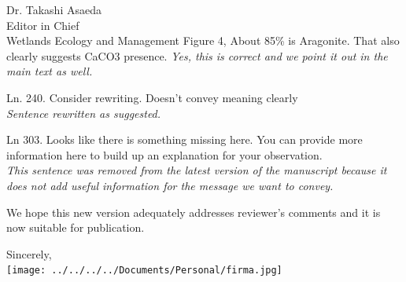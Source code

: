 \documentclass[11pt]{bgcletter}
\begin{document}
\begin{letter}{Dr. Takashi Asaeda\\
 Editor in Chief \\ Wetlands Ecology and Management}
{\color{blue} Figure 4, About 85\% is Aragonite. That also clearly suggests CaCO3 presence. }
{\it Yes, this is correct and we point it out in the main text as well. }

{\color{blue} Ln. 240. Consider rewriting. Doesn't convey meaning clearly} \\
{\it Sentence rewritten as suggested.}

{\color{blue} Ln 303. Looks like there is something missing here. You can provide more information here to build up an explanation for your observation. } \\
{\it This sentence was removed from the latest version of the manuscript because it does not add useful information for the message we want to convey. }

\vspace{2em}
We hope this new version adequately addresses reviewer's comments and it is now suitable for publication.

\closing{Sincerely, \\
 \texttt{[image: ../../../../Documents/Personal/firma.jpg]}
 }
 \end{letter}

 
\end{document}
